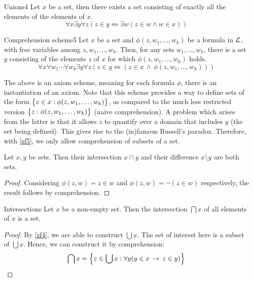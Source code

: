 \documentclass{styles/tufte}
\begin{document}
\begin{zf}{Unions}{4}
  Let $x$ be a set, then there exists a set consisting of exactly all the elements of the elements of $x$.
  \[ \forall x \exists y \forall z \left(z \in y \iff \exists w (z \in w \land w \in x)\right) \]
\end{zf}

\begin{zf}{Comprehension scheme}{5}
  Let $x$ be a set and $\phi(z, w_1, \dots, w_k)$ be a formula in $\mathcal{L}$, with free variables among $z, w_1, \dots, w_k$. Then, for any sets $w_1, \dots, w_k$, there is a set $y$ consisting of the elements $z$ of $x$ for which $\phi(z, w_1, \dots, w_k)$ holds.
  \[ \forall x \forall w_1 \cdots \forall w_k \exists y \forall z \left(z \in y \iff \left(z \in x \,\land\, \phi(z, w_1, \dots, w_k)\right)\!\right) \]
\end{zf}

The above is an axiom scheme, meaning for each formula $\phi$, there is an instantiation of an axiom. Note that this scheme provides a way to define sets of the form $\set{z \in x: \phi(z, w_1, \dots, w_k)}$, as compared to the much less restricted version $\set{z: \phi(z, w_1, \dots, w_k)}$ (naive comprehension). A problem which arises from the latter is that it allows $z$ to quantify over a domain that includes $y$ (the set being defined). This gives rise to the (in)famous Russell's paradox. Therefore, with \cref{zf5}, we only allow comprehension of subsets of a set.

\begin{theorem}{}{}
  Let $x, y$ be sets. Then their intersection $x \cap y$ and their difference $x \setminus y$ are both sets.
\end{theorem}
\begin{proof}
  Considering $\phi(z, w) = z \in w$ and $\phi(z, w) = \neg(z \in w)$ respectively, the result follows by comprehension.
\end{proof}

\begin{theorem}{Intersections}{}
  Let $x$ be a non-empty set. Then the intersection $\bigcap x$ of all elements of $x$ is a set.
\end{theorem}
\begin{proof}
  By \cref{zf4}, we are able to construct $\bigcup x$. The set of interest here is a subset of $\bigcup x$. Hence, we can construct it by comprehension:
  \[ \bigcap x = \set{z \in \bigcup x: \forall y (y \in x \,\implies\, z \in y)} \qedhere \]
\end{proof}
\end{document}
